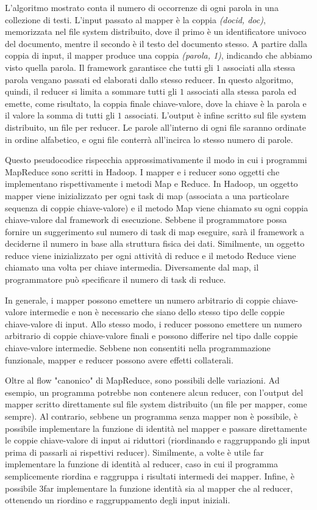 \documentclass{article}
\begin{document}
L'algoritmo mostrato conta il numero di occorrenze di ogni parola in una collezione di testi. L'input passato al mapper è la coppia \textit{(docid, doc)}, memorizzata nel file system distribuito, dove il primo è un identificatore univoco del documento, mentre il secondo è il testo del documento stesso. A partire dalla coppia di input, il mapper produce una coppia \textit{(parola, 1)}, indicando che abbiamo visto quella parola. Il framework garantisce che tutti gli $1$ associati alla stessa parola vengano passati ed elaborati dallo stesso reducer.
In questo algoritmo, quindi, il reducer si limita a sommare tutti gli $1$ associati alla stessa parola ed emette, come risultato, la coppia finale chiave-valore, dove la chiave è la parola e il valore la somma di tutti gli $1$ associati. L'output è infine scritto sul file system distribuito, un file per reducer. Le parole all'interno di ogni file saranno ordinate in ordine alfabetico, e ogni file conterrà all'incirca lo stesso numero di parole.

Questo pseudocodice rispecchia approssimativamente il modo in cui i programmi MapReduce sono scritti in Hadoop. I mapper e i reducer sono oggetti che implementano rispettivamente i metodi Map e Reduce. 
In Hadoop, un oggetto mapper viene inizializzato per ogni task di map (associata a una particolare sequenza di coppie chiave-valore) e il metodo Map viene chiamato su ogni coppia chiave-valore dal framework di esecuzione. Sebbene il programmatore possa fornire un suggerimento sul numero di task di map eseguire, sarà il framework a deciderne il numero in base alla struttura fisica dei dati. Similmente, un oggetto reduce viene inizializzato per ogni attività di reduce e il metodo Reduce viene chiamato una volta per chiave intermedia. Diversamente dal map, il programmatore può specificare il numero di task di reduce. 

In generale, i mapper possono emettere un numero arbitrario di coppie chiave-valore intermedie e non è necessario che siano dello stesso tipo delle coppie chiave-valore di input. Allo stesso modo, i reducer possono emettere un numero arbitrario di coppie chiave-valore finali e possono differire nel tipo dalle coppie chiave-valore intermedie. Sebbene non consentiti nella programmazione funzionale, mapper e reducer possono avere effetti collaterali.

Oltre al flow "canonico" di MapReduce, sono possibili delle variazioni. Ad esempio, un programma potrebbe non contenere alcun reducer, con l'output del mapper scritto direttamente sul file system distribuito (un file per mapper, come sempre). Al contrario, sebbene un programma senza mapper non è possibile, è possibile implementare la funzione di identità nel mapper e passare direttamente le coppie chiave-valore di input ai riduttori (riordinando e raggruppando gli input prima di passarli ai rispettivi reducer). Similmente, a volte è utile far implementare la funzione di identità al reducer, caso in cui il programma semplicemente riordina e raggruppa i risultati intermedi dei mapper. Infine, è possibile 3far implementare la funzione identità sia al mapper che al reducer, ottenendo un riordino e raggruppamento degli input iniziali.
\end{document}
